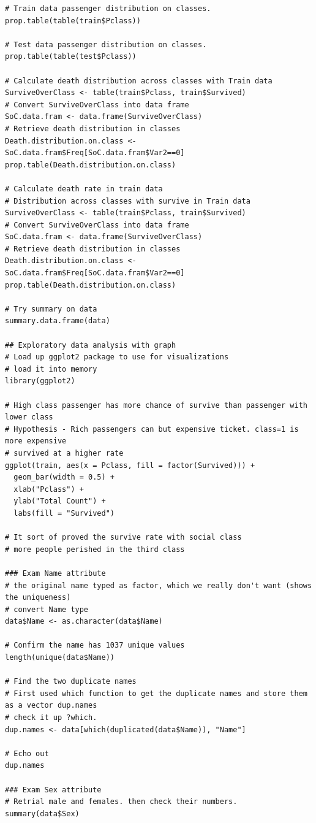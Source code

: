\documentclass[
]{book}
\begin{document}
\begin{verbatim}
# Train data passenger distribution on classes.
prop.table(table(train$Pclass))

# Test data passenger distribution on classes.
prop.table(table(test$Pclass))

# Calculate death distribution across classes with Train data
SurviveOverClass <- table(train$Pclass, train$Survived)
# Convert SurviveOverClass into data frame
SoC.data.fram <- data.frame(SurviveOverClass)
# Retrieve death distribution in classes
Death.distribution.on.class <- SoC.data.fram$Freq[SoC.data.fram$Var2==0]
prop.table(Death.distribution.on.class)

# Calculate death rate in train data
# Distribution across classes with survive in Train data
SurviveOverClass <- table(train$Pclass, train$Survived)
# Convert SurviveOverClass into data frame
SoC.data.fram <- data.frame(SurviveOverClass)
# Retrieve death distribution in classes
Death.distribution.on.class <- SoC.data.fram$Freq[SoC.data.fram$Var2==0]
prop.table(Death.distribution.on.class)

# Try summary on data
summary.data.frame(data)

## Exploratory data analysis with graph
# Load up ggplot2 package to use for visualizations
# load it into memory
library(ggplot2)

# High class passenger has more chance of survive than passenger with lower class
# Hypothesis - Rich passengers can but expensive ticket. class=1 is more expensive
# survived at a higher rate
ggplot(train, aes(x = Pclass, fill = factor(Survived))) +
  geom_bar(width = 0.5) +
  xlab("Pclass") +
  ylab("Total Count") +
  labs(fill = "Survived")

# It sort of proved the survive rate with social class
# more people perished in the third class

### Exam Name attribute
# the original name typed as factor, which we really don't want (shows the uniqueness)
# convert Name type
data$Name <- as.character(data$Name)

# Confirm the name has 1037 unique values
length(unique(data$Name))

# Find the two duplicate names
# First used which function to get the duplicate names and store them as a vector dup.names
# check it up ?which.
dup.names <- data[which(duplicated(data$Name)), "Name"]

# Echo out
dup.names

### Exam Sex attribute
# Retrial male and females. then check their numbers.
summary(data$Sex)


\end{verbatim}
\end{document}
